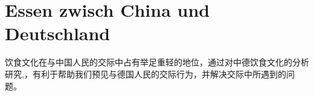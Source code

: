 \chapter{Essen zwisch China und Deutschland}

\cleardoubleemptypage
饮食文化在与中国人民的交际中占有举足重轻的地位，通过对中德饮食文化的分析研究,，有利于帮助我们预见与德国人民的交际行为，并解决交际中所遇到的问题。
